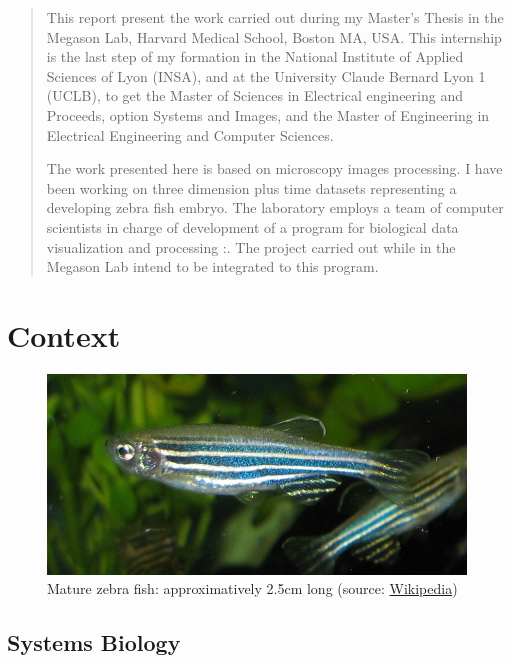 
\begin{abstract}
  This report present the work carried out during my Master's Thesis in the Megason Lab, Harvard Medical School, Boston MA, USA.
  This internship is the last step of my formation in the National Institute of Applied Sciences of Lyon (INSA), and at the University Claude Bernard Lyon 1 (UCLB), to get the Master of Sciences in Electrical engineering and Proceeds, option Systems and Images, and the Master of Engineering in Electrical Engineering and Computer Sciences.

  The work presented here is based on microscopy images processing. I have been working on three dimension plus time datasets representing a developing zebra fish embryo. 
  The laboratory employs a team of computer scientists in charge of development of a program for biological data visualization and processing :{\gofigure}\cite{refGofigure2}.
  The project carried out while in the Megason Lab intend to be integrated to this program.
  
\tableofcontents  
  
 
\end{abstract}


\chapter{Context}

\begin{figure}[htb]
\begin{center}
\leavevmode
\includegraphics[width=0.99\textwidth]{pictures/zebrafishPic}
\end{center}
\caption{Mature zebra fish: approximatively 2.5cm long (source: \href{http://en.wikipedia.org/wiki/File:Zebrafisch.jpg}{Wikipedia})}
\label{fig:ZebraPic}
\end{figure}

\section{Systems Biology}

